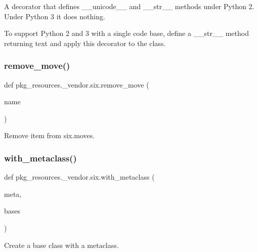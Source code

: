 \begin{DoxyVerb}A decorator that defines __unicode__ and __str__ methods under Python 2.
Under Python 3 it does nothing.

To support Python 2 and 3 with a single code base, define a __str__ method
returning text and apply this decorator to the class.
\end{DoxyVerb}
 \mbox{\label{namespacepkg__resources_1_1__vendor_1_1six_ad00ea9b7a2ee5f47e13b812f9aef3d1d}} 
\subsubsection{\texorpdfstring{remove\+\_\+move()}{remove\_move()}}
{\footnotesize\ttfamily def pkg\+\_\+resources.\+\_\+vendor.\+six.\+remove\+\_\+move (\begin{DoxyParamCaption}\item[{}]{name }\end{DoxyParamCaption})}

\begin{DoxyVerb}Remove item from six.moves.\end{DoxyVerb}
 \mbox{\label{namespacepkg__resources_1_1__vendor_1_1six_a81f405813a1ac39dd5a1fbc362f9934a}} 
\subsubsection{\texorpdfstring{with\+\_\+metaclass()}{with\_metaclass()}}
{\footnotesize\ttfamily def pkg\+\_\+resources.\+\_\+vendor.\+six.\+with\+\_\+metaclass (\begin{DoxyParamCaption}\item[{}]{meta,  }\item[{}]{bases }\end{DoxyParamCaption})}

\begin{DoxyVerb}Create a base class with a metaclass.\end{DoxyVerb}
 
